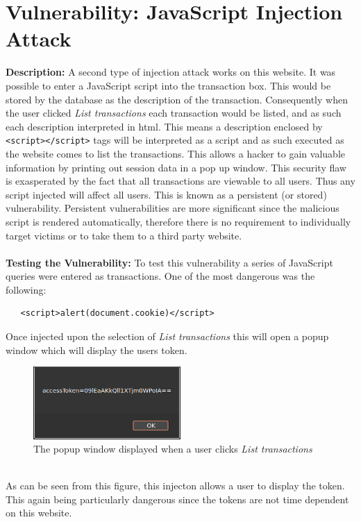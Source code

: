 \section{Vulnerability: JavaScript Injection Attack}
\label{sec:background}
\textbf{Description:} A second type of injection attack works on this website. It was possible to enter a JavaScript script into the transaction box. This would be stored by
the database as the description of the transaction. Consequently when the user clicked \textit{List transactions} each transaction would be listed, and as such each description
interpreted in html. This means a description enclosed by \verb|<script></script>| tags will be interpreted as a script and as such executed as the website comes to list the
transactions. This allows a hacker to gain valuable information by printing out session data in a pop up window. This security flaw is exasperated by the fact that all transactions
are viewable to all users. Thus any script injected will affect all users. This is known as a persistent (or stored) vulnerability. Persistent vulnerabilities are more significant
since the malicious script is rendered automatically, therefore there is no requirement to individually target victims or to take them to a third party website.\\ \\
\textbf{Testing the Vulnerability:} To test this vulnerability a series of JavaScript queries were entered as transactions. One of the most dangerous was the following:
\begin{verbatim}
   <script>alert(document.cookie)</script>
\end{verbatim}
Once injected upon the selection of \textit{List transactions} this will open a popup window which will display the users token.
\begin{figure}[h]
   \centering
   \includegraphics[width=0.5\textwidth]{figs/popup.png}
   \caption{The popup window displayed when a user clicks \textit{List transactions}}
   \label{popup}
\end{figure}\\
As can be seen from this figure, this injecton allows a user to display the token. This again being particularly dangerous since the tokens are not time dependent on this website.
